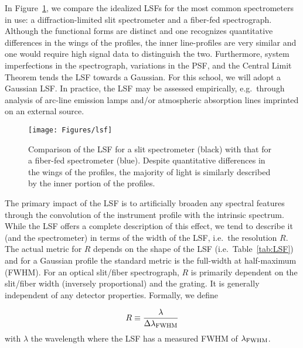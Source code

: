\documentclass[graybox]{svmult}
\begin{document}
In Figure~\ref{fig:LSF}, we compare the idealized LSFs for the
most common spectrometers in use: a diffraction-limited slit 
spectrometer and a fiber-fed spectrograph.
Although the functional forms are distinct and one recognizes
quantitative differences in the wings of the profiles,
the inner line-profiles are very similar and one would
require high signal data to distinguish the two.
Furthermore, system imperfections in the spectrograph, variations
in the PSF, and the Central Limit Theorem tends the LSF 
towards a Gaussian. For this school, we will adopt a Gaussian LSF.
In practice, the LSF may be assessed empirically, e.g.\ through
analysis of arc-line emission lamps and/or 
atmospheric absorption lines imprinted on an external source.


%
\begin{figure}[b]
\sidecaption
\texttt{[image: Figures/lsf]}
%
%
\caption{Comparison of the LSF for a slit spectrometer (black) with
that for a fiber-fed spectrometer (blue).  Despite quantitative 
differences in the wings of the profiles, the majority of light is
similarly described by the inner portion of the profiles.
}
\label{fig:LSF}       %
\end{figure}


The primary impact of the LSF is to artificially broaden
any spectral features through the convolution of the instrument
profile with the intrinsic spectrum.  While the LSF offers a
complete description of this effect, we tend to describe it
(and the spectrometer) in terms of the width of the LSF, 
i.e.\ the resolution $R$.
The actual metric for $R$ depends on the shape of the 
LSF (i.e.\ Table~\ref{tab:LSF}) and for a Gaussian profile
the standard metric is the full-width at half-maximum (FWHM).
For an optical slit/fiber spectrograph, $R$ is primarily 
dependent on the slit/fiber width (inversely proportional)
and the grating.  It is generally independent of any detector
properties.  Formally, we define

\begin{equation}
R \equiv \frac{\lambda}{\Delta\lambda_{\rm FWHM}}
\label{eqn:R}
\end{equation}
with $\lambda$ the wavelength where the LSF has a measured
FWHM of $\lambda_{\rm FWHM}$.
\end{document}
